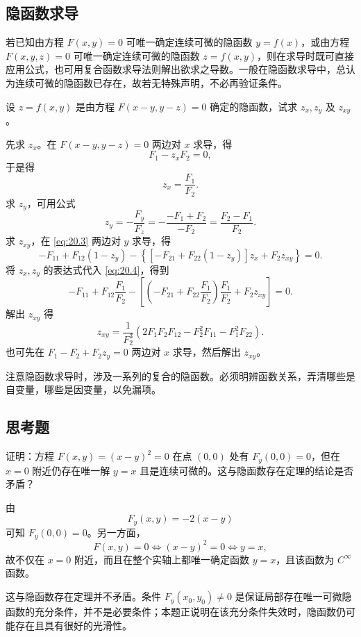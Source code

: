 \subsection{隐函数求导}

若已知由方程 $F(x,y)=0$ 可唯一确定连续可微的隐函数 $y=f(x)$，或由方程 $F(x,y,z)=0$ 可唯一确定连续可微的隐函数 $z=f(x,y)$，则在求导时既可直接应用公式，也可用复合函数求导法则解出欲求之导数。一般在隐函数求导中，总认为连续可微的隐函数已存在，故若无特殊声明，不必再验证条件。

\begin{xexample}[20.1.3]
设 $z=f(x,y)$ 是由方程 $F(x-y,y-z)=0$ 确定的隐函数，试求 $z_x,z_y$ 及 $z_{xy}$。
\end{xexample}
\begin{xsolution}
先求 $z_x$。在 $F(x-y,y-z)=0$ 两边对 $x$ 求导，得
\begin{equation}
  F_1-z_xF_2=0,
  \tag{20.3}
  \label{eq:20.3}
\end{equation}
于是得
\[
  z_x=\frac{F_1}{F_2}.
\]
求 $z_y$，可用公式
\[
  z_y=-\frac{F_y}{F_z}
  =-\frac{-F_1+F_2}{-F_2}
  =\frac{F_2-F_1}{F_2}.
\]
求 $z_{xy}$，在 \eqref{eq:20.3} 两边对 $y$ 求导，得
\begin{equation}
  -F_{11}+F_{12}(1-z_y)
  -\left\{[-F_{21}+F_{22}(1-z_y)]z_x+F_2z_{xy}\right\}=0.
  \tag{20.4}
  \label{eq:20.4}
\end{equation}
将 $z_x,z_y$ 的表达式代入 \eqref{eq:20.4}，得到
\[
  -F_{11}+F_{12}\frac{F_1}{F_2}
  -\left[\left(-F_{21}+F_{22}\frac{F_1}{F_2}\right)\frac{F_1}{F_2}+F_2z_{xy}\right]=0.
\]
解出 $z_{xy}$ 得
\[
  z_{xy}=\frac{1}{F_2^3}\left(2F_1F_2F_{12}-F_2^2F_{11}-F_1^2F_{22}\right).
\]
也可先在 $F_1-F_2+F_2z_y=0$ 两边对 $x$ 求导，然后解出 $z_{xy}$。
\end{xsolution}

注意隐函数求导时，涉及一系列的复合的隐函数。必须明辨函数关系，弄清哪些是自变量，哪些是因变量，以免漏项。

\subsection{思考题}

\begin{xthought}[1]
证明：方程 $F(x,y)=(x-y)^2=0$ 在点 $(0,0)$ 处有 $F_y(0,0)=0$，但在 $x=0$ 附近仍存在唯一解 $y=x$ 且是连续可微的。这与隐函数存在定理的结论是否矛盾？
\end{xthought}
\begin{xsolution}
由
\[
  F_y(x,y)=-2(x-y)
\]
可知 $F_y(0,0)=0$。另一方面，
\[
  F(x,y)=0\iff (x-y)^2=0\iff y=x,
\]
故不仅在 $x=0$ 附近，而且在整个实轴上都唯一确定函数 $y=x$，且该函数为 $C^\infty$ 函数。

这与隐函数存在定理并不矛盾。条件 $F_y(x_0,y_0)\ne0$ 是保证局部存在唯一可微隐函数的充分条件，并不是必要条件；本题正说明在该充分条件失效时，隐函数仍可能存在且具有很好的光滑性。
\end{xsolution}


